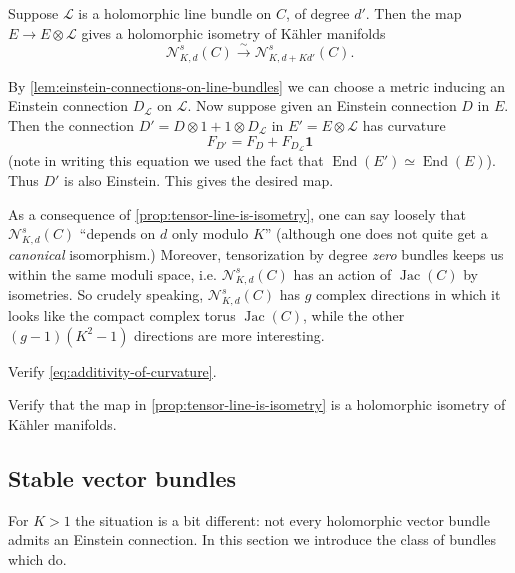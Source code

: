\documentclass[12pt,letterpaper,reqno]{article}
\numberwithin{equation}{section}
\newcommand{\cL}{\ensuremath{\mathcal L}}
\newcommand{\cN}{\ensuremath{\mathcal N}}
\newcommand{\kahler}{K\"ahler\xspace}
\newcommand\bid{{\mathbf 1}}
\newcommand{\simarrow}{\xrightarrow\sim}
\newcommand{\ti}[1]{\textit{#1}}
\DeclareMathOperator{\End}{End}
\DeclareMathOperator{\Jac}{Jac}
\begin{document}
\begin{prop} \label{prop:tensor-line-is-isometry}
Suppose $\cL$ is a holomorphic line bundle on $C$, of degree $d'$.
Then the map $E \to E \otimes \cL$ gives a holomorphic 
isometry of \kahler manifolds
\begin{equation}
\cN^s_{K,d}(C) \simarrow \cN^s_{K,d+Kd'}(C).
\end{equation}
\end{prop}
\begin{pf}
By \autoref{lem:einstein-connections-on-line-bundles} we can choose 
a metric inducing an Einstein connection $D_\cL$ on $\cL$. Now 
suppose given an Einstein connection $D$ in $E$. Then the connection
$D' = D \otimes 1 + 1 \otimes D_\cL$ in $E' = E \otimes \cL$ has curvature 
\begin{equation} \label{eq:additivity-of-curvature}
 F_{D'} = F_D + F_{D_\cL} \bid
\end{equation}
(note in writing this equation we used
the fact that $\End(E') \simeq \End(E)$).
Thus $D'$ is also Einstein. This gives the desired map.
\end{pf}

As a consequence of \autoref{prop:tensor-line-is-isometry}, one can say
loosely that $\cN_{K,d}^s(C)$ ``depends on $d$ only modulo $K$''
(although one does not quite get a \ti{canonical} isomorphism.)
Moreover, tensorization by degree \ti{zero} bundles keeps us within
the same moduli space, i.e. $\cN_{K,d}^s(C)$ has an action of $\Jac(C)$ by isometries. 
So crudely speaking, $\cN_{K,d}^s(C)$ has $g$ complex directions in which 
it looks like the compact complex torus $\Jac(C)$, while the other
$(g-1)(K^2-1)$ directions are more interesting.

\begin{exercise} Verify \eqref{eq:additivity-of-curvature}.
\end{exercise}

\begin{exercise} Verify that the map in 
\autoref{prop:tensor-line-is-isometry} is a holomorphic
isometry of \kahler manifolds.
\end{exercise}




\subsection{Stable vector bundles}

For $K > 1$ the situation is a bit different:
not every holomorphic vector bundle admits an Einstein connection.
In this section we introduce the class of bundles which do.
\end{document}
